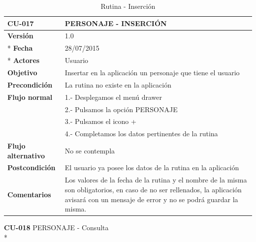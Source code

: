 \documentclass[../pfc.tex]{subfiles}
\begin{document}
		\begin{table}[H]
			\centering
			\begin{tabular}[t]{|p{3cm}|p{9.5cm}|}
				\hline \textbf{CU-017} & \textbf{PERSONAJE - INSERCIÓN} \\*
				\hline\hline \textbf{Versión} & 1.0 \\ *
				\hline\hline \textbf{Fecha} & 28/07/2015 \\ *
				\hline\textbf{Actores} 	& Usuario\\*
				\hline \textbf{Objetivo} & Insertar en la aplicación un personaje que tiene el usuario\\* 			
				\hline \textbf{Precondición} & La rutina no existe en la aplicación\\* 
				\hline \textbf{Flujo normal} & 1.- Desplegamos el menú drawer \\* 
				& 2.- Pulsamos la opción PERSONAJE\\*	
				& 3.- Pulsamos el icono +\\*	
				& 4.- Completamos los datos pertinentes de la rutina\\*	
				\hline \textbf{Flujo alternativo} & No se contempla \\* 
				\hline \textbf{Postcondición} & El usuario ya posee los datos de la rutina en la aplicación \\* 
				\hline \textbf{Comentarios}   & Los valores de la fecha de la rutina y el nombre de la misma son obligatorios, en caso de no ser rellenados, la aplicación avisará con un mensaje de error y no se podrá guardar la misma.\\*
				\hline
			\end{tabular}
			\caption{Rutina - Inserción}
			\label{tabla:caso017}
		\end{table}
		
		\textbf{CU-018}	PERSONAJE - Consulta\\*
		
\end{document}
